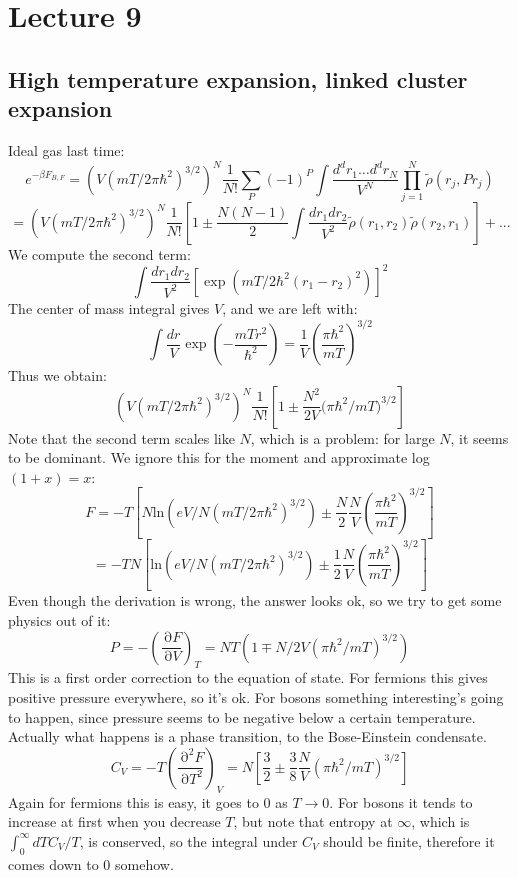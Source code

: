 \documentclass[12 pt]{article}
\DeclareMathOperator {\p} {\partial}
\begin{document}
\section*{Lecture 9}
\subsection*{High temperature expansion, linked cluster expansion}
Ideal gas last time:
\[       e^{-\beta F_{B,F}} = \left(  V (mT/2\pi \hbar^2)^{3/2} \right)^N \frac{1}{N!} \sum_P (-1)^P \int \frac{d^d r_1 \dots d^d r_N}{V^N} \prod_{j=1}^N \tilde \rho(r_j, P r_j)    \]
\[    =    \left(  V (mT/2\pi \hbar^2)^{3/2} \right)^N \frac{1}{N!} \left[  1 \pm \frac{N(N-1)}{2}\int \frac{dr_1 dr_2}{V^2} \tilde \rho(r_1, r_2) \tilde \rho(r_2, r_1)  \right] + ...  \]
We compute the second term:
\[        \int \frac{dr_1 dr_2}{V^2} \left[  \exp(mT/2\hbar^2 (r_1 - r_2)^2) \right]^2     \]
The center of mass integral gives $V$, and we are left with:
\[      \int \frac{dr}{V} \exp\left( - \frac{mTr^2}{\hbar^2} \right) = \frac{1}{V} \left( \frac{\pi \hbar^2}{mT} \right)^{3/2}     \]
Thus we obtain:
\[     \left(  V (mT/2\pi \hbar^2)^{3/2} \right)^N \frac{1}{N!} \left[  1 \pm  \frac{N^2}{2V} \big( \pi \hbar^2 / mT \big)^{3/2}  \right]     \]
Note that the second term scales like $N$, which is a problem: for large $N$, it seems to be dominant. We ignore this for the moment and approximate log$(1+x) = x$:
\[        F = -T \left[  N \text{ln} ( eV/N (mT/2\pi \hbar^2)^{3/2})   \pm \frac{N}{2} \frac{N}{V}   ( \frac{\pi \hbar^2}{mT} )^{3/2}  \right]  \]
\[      = - TN \left [  \text{ln} ( eV/N (mT/2\pi \hbar^2)^{3/2})   \pm \frac{1}{2} \frac{N}{V}   ( \frac{\pi \hbar^2}{mT} )^{3/2}  \right]      \]
Even though the derivation is wrong, the answer looks ok, so we try to get some physics out of it:
\[      P = - \left( \frac{\p F}{\p V} \right)_T = NT \left(  1 \mp  N/2V  (\pi \hbar^2 / m T)^{3/2}  \right)      \]
This is a first order correction to the equation of state. For fermions this gives positive pressure everywhere, so it's ok. For bosons something interesting's going to happen, since pressure seems to be negative below a certain temperature. Actually what happens is a phase transition, to the Bose-Einstein condensate.
\[      C_V = - T \left( \frac{\p^2 F}{\p T^2}  \right)_V  = N \left[ \frac{3}{2} \pm \frac{3}{8} \frac{N}{V} (\pi \hbar^2/mT)^{3/2}  \right]   \]
Again for fermions this is easy, it goes to $0$ as $T\to 0$. For bosons it tends to increase at first when you decrease $T$, but note that entropy at $\infty$, which is $\int_0^{\infty} dT C_V /T$, is conserved, so the integral under $C_V$ should be finite, therefore it comes down to $0$ somehow.
\end{document}
